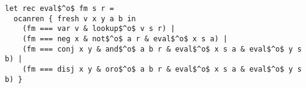 \begin{lstlisting}
let rec eval$^o$ fm s r =
  ocanren { fresh v x y a b in
    (fm === var v & lookup$^o$ v s r) |
    (fm === neg x & not$^o$ a r & eval$^o$ x s a) |
    (fm === conj x y & and$^o$ a b r & eval$^o$ x s a & eval$^o$ y s b) |
    (fm === disj x y & oro$^o$ a b r & eval$^o$ x s a & eval$^o$ y s b) }
  \end{lstlisting}